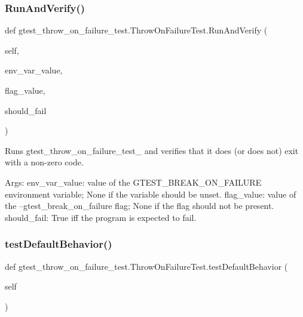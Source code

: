 \subsubsection{\texorpdfstring{Run\+And\+Verify()}{RunAndVerify()}}
{\footnotesize\ttfamily def gtest\+\_\+throw\+\_\+on\+\_\+failure\+\_\+test.\+Throw\+On\+Failure\+Test.\+Run\+And\+Verify (\begin{DoxyParamCaption}\item[{}]{self,  }\item[{}]{env\+\_\+var\+\_\+value,  }\item[{}]{flag\+\_\+value,  }\item[{}]{should\+\_\+fail }\end{DoxyParamCaption})}

\begin{DoxyVerb}Runs gtest_throw_on_failure_test_ and verifies that it does
(or does not) exit with a non-zero code.

Args:
  env_var_value:    value of the GTEST_BREAK_ON_FAILURE environment
                variable; None if the variable should be unset.
  flag_value:       value of the --gtest_break_on_failure flag;
                None if the flag should not be present.
  should_fail:      True iff the program is expected to fail.
\end{DoxyVerb}
 \mbox{\label{classgtest__throw__on__failure__test_1_1_throw_on_failure_test_a596d5e2dbeb51751a6fb6d3852fdd54a}} 
\subsubsection{\texorpdfstring{test\+Default\+Behavior()}{testDefaultBehavior()}}
{\footnotesize\ttfamily def gtest\+\_\+throw\+\_\+on\+\_\+failure\+\_\+test.\+Throw\+On\+Failure\+Test.\+test\+Default\+Behavior (\begin{DoxyParamCaption}\item[{}]{self }\end{DoxyParamCaption})}

